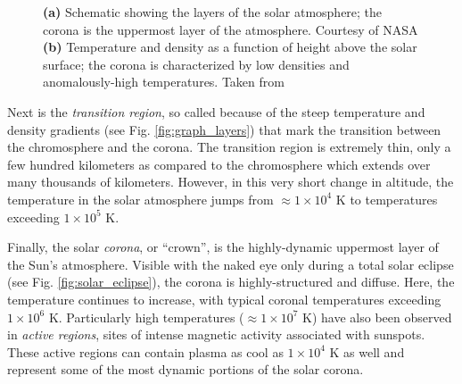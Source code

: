 \begin{figure}[htbp]
	\centering
	\caption{\textbf{(a)} Schematic showing the layers of the solar atmosphere; the corona is the uppermost layer of the atmosphere. Courtesy of NASA \textbf{(b)} Temperature and density as a function of height above the solar surface; the corona is characterized by low densities and anomalously-high temperatures. Taken from \citet{gary_solar_2007}}
	\label{fig:layers}
\end{figure} 
%
\par Next is the \textit{transition region}, so called because of the steep temperature and density gradients (see Fig. \ref{fig:graph_layers}) that mark the transition between the chromosphere and the corona. The transition region is extremely thin, only a few hundred kilometers as compared to the chromosphere which extends over many thousands of kilometers. However, in this very short change in altitude, the temperature in the solar atmosphere jumps from $\approx1\times10^4$ K to temperatures exceeding $1\times10^5$ K. 
%
\par Finally, the solar \textit{corona}, or ``crown'', is the highly-dynamic uppermost layer of the Sun's atmosphere. Visible with the naked eye only during a total solar eclipse (see Fig. \ref{fig:solar_eclipse}), the corona is highly-structured and diffuse. Here, the temperature continues to increase, with typical coronal temperatures exceeding $1\times10^6$ K. Particularly high temperatures ($\approx1\times10^7$ K) have also been observed in \textit{active regions}, sites of intense magnetic activity associated with sunspots. These active regions can contain plasma as cool as $1\times10^4$ K as well and represent some of the most dynamic portions of the solar corona.
